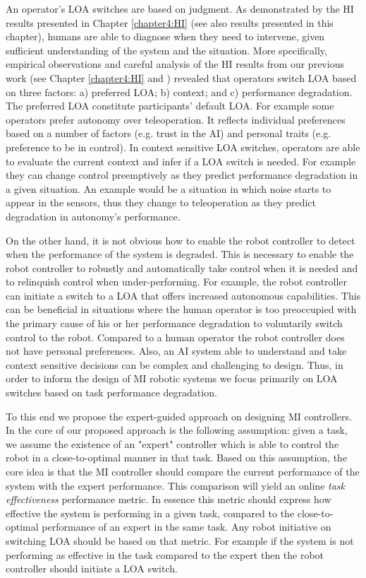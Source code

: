 \documentclass[a4paper,12pt,oneside,openright]{bhamthesis}
\begin{document}
An operator's LOA switches are based on judgment. As demonstrated by the HI results presented in Chapter \ref{chapter4:HI} (see also results presented in this chapter), humans are able to diagnose when they need to intervene, given sufficient understanding of the system and the situation. More specifically, empirical observations and careful analysis of the HI results from our previous work (see Chapter \ref{chapter4:HI} and \cite{Chiou2016,Chiou2016_AAAI}) revealed that operators switch LOA based on three factors: a) preferred LOA; b) context; and c) performance degradation. The preferred LOA constitute participants' default LOA. For example some operators prefer autonomy over teleoperation. It reflects individual preferences based on a number of factors (e.g. trust in the AI) and personal traits (e.g. preference to be in control). In context sensitive LOA switches, operators are able to evaluate the current context and infer if a LOA switch is needed. For example they can change control preemptively as they predict performance degradation in a given situation. An example would be a situation in which noise starts to appear in the sensors, thus they change to teleoperation as they predict degradation in autonomy's performance.

On the other hand, it is not obvious how to enable the robot controller to detect when the performance of the system is degraded. This is necessary to enable the robot controller to robustly and automatically take control when it is needed and to relinquish control when under-performing. For example, the robot controller can initiate a switch to a LOA that offers increased autonomous capabilities. This can be beneficial in situations where the human operator is too preoccupied with the primary cause of his or her performance degradation to voluntarily switch control to the robot. Compared to a human operator the robot controller does not have personal preferences. Also, an AI system able to understand and take context sensitive decisions can be complex and challenging to design. Thus, in order to inform the design of MI robotic systems we focus primarily on LOA switches based on task performance degradation. 

To this end we propose the expert-guided approach on designing MI controllers. In the core of our proposed approach is the following assumption: given a task, we assume the existence of an "expert" controller which is able to control the robot in a close-to-optimal manner in that task. Based on this assumption, the core idea is that the MI controller should compare the current performance of the system with the expert performance. This comparison will yield an online \textit{task effectiveness} performance metric. In essence this metric should express how effective the system is performing in a given task, compared to the close-to-optimal performance of an expert in the same task. Any robot initiative on switching LOA should be based on that metric. For example if the system is not performing as effective in the task compared to the expert then the robot controller should initiate a LOA switch.
\end{document}
